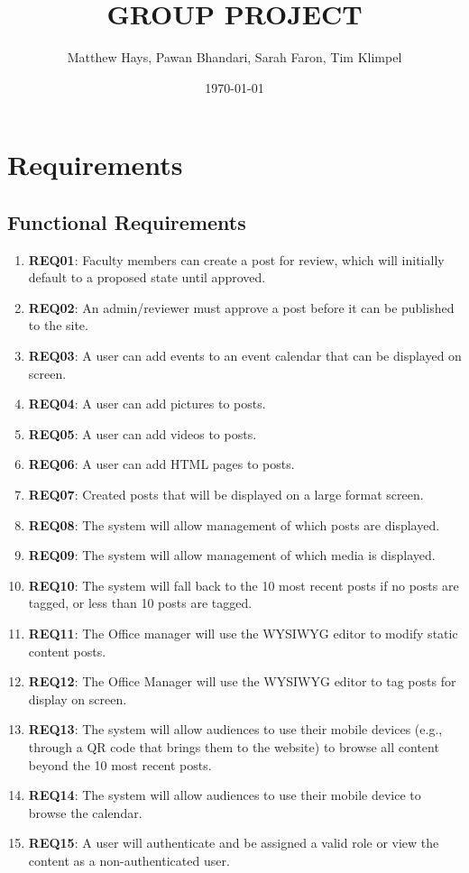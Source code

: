 \documentclass{article}
\title{GROUP PROJECT}
\date{\today}
\author{Matthew Hays, Pawan Bhandari, Sarah Faron, Tim Klimpel}
\begin{document}
\maketitle
\newpage
\tableofcontents
\listoffigures
\newpage

\section{Requirements}
\subsection{Functional Requirements}
\begin{enumerate}
    \item \textbf{REQ01}: Faculty members can create a post for review, which will initially default to a proposed state until approved.
    \item \textbf{REQ02}: An admin/reviewer must approve a post before it can be published to the site.
    \item \textbf{REQ03}: A user can add events to an event calendar that can be displayed on screen.
    \item \textbf{REQ04}: A user can add pictures to posts.
    \item \textbf{REQ05}: A user can add videos to posts.
    \item \textbf{REQ06}: A user can add HTML pages to posts.
    \item \textbf{REQ07}: Created posts that will be displayed on a large format screen.
    \item \textbf{REQ08}: The system will allow management of which posts are displayed.
    \item \textbf{REQ09}: The system will allow management of which media is displayed.
    \item \textbf{REQ10}: The system will fall back to the 10 most recent posts if no posts are tagged, or less than 10 posts are tagged.
    \item \textbf{REQ11}: The Office manager will use the WYSIWYG editor to modify static content posts. 
    \item \textbf{REQ12}: The Office Manager will use the WYSIWYG editor to tag posts for display on screen.
    \item \textbf{REQ13}: The system will allow audiences to use their mobile devices (e.g., through a QR code that brings them to the website) to browse all content beyond the 10 most recent posts.
    \item \textbf{REQ14}: The system will allow audiences to use their mobile device to browse the calendar.
    \item \textbf{REQ15}: A user will authenticate and be assigned a valid role or view the content as a non-authenticated user.
\end{enumerate}
\end{document}
